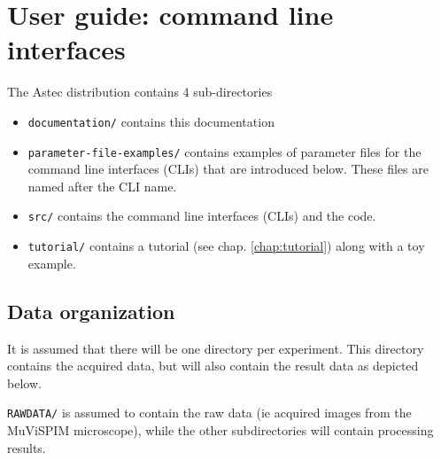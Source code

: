 \chapter{User guide: command line interfaces}
\label{chap:clis}

The Astec distribution contains 4 sub-directories

\mbox{}
\mbox{}

\begin{itemize}
\itemsep -0.5ex
\item \texttt{documentation/} contains this documentation
\item \texttt{parameter-file-examples/} contains examples of parameter
  files for the command line interfaces (CLIs) that are
  introduced below. These files are named after the CLI name.
\item \texttt{src/} contains the command line interfaces (CLIs)  and the code.
\item \texttt{tutorial/} contains a tutorial (see chap. \ref{chap:tutorial}) along with a toy example.
\end{itemize}





%
%
%


\section*{Data organization}
\label{}

It is assumed that there will be one directory per experiment. This
directory contains the acquired data, but will also contain the result
data as depicted below.

\mbox{}
\mbox{}

\texttt{RAWDATA/} is assumed to contain the raw data (ie acquired
images from the MuViSPIM microscope), while the other subdirectories
will contain processing results.

%
%



